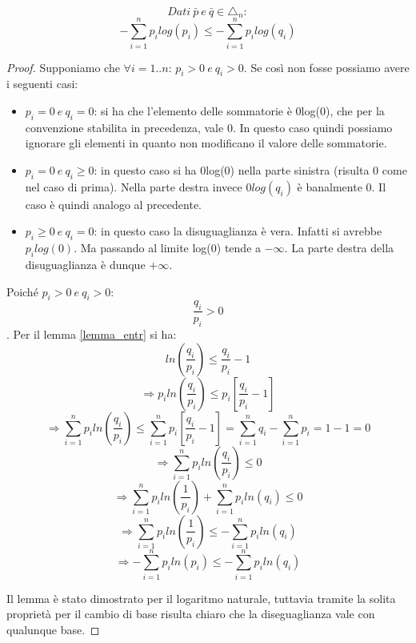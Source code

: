 \begin{lemma}

 \[Dati \ \bar{p} \ e \  \bar{q} \in \triangle_n:\] 
 \[ -\sum_{i=1}^n p_i log(p_i) \le - \sum_{i=1}^n p_i log(q_i) \]

 \begin{proof}
    
   Supponiamo che $\forall i=1..n$: $p_i>0 \ e \ q_i>0$.
  Se così non fosse possiamo avere i seguenti casi:

  \begin{itemize}
   \item $p_i=0 \ e \ q_i=0$: si ha che l'elemento delle sommatorie è 0log(0), che per la convenzione 
   stabilita in precedenza, vale 0. In questo caso quindi possiamo ignorare gli elementi
   in quanto non modificano il valore delle sommatorie.
   \item $p_i=0 \ e \ q_i \ge 0$: in questo caso si ha 0log(0) nella parte sinistra (risulta 0
   come nel caso di prima). Nella parte destra invece $0log(q_i)$ è banalmente 0.
   Il caso è quindi analogo al precedente.
   \item $p_i \ge 0 \ e \ q_i=0$: in questo caso la disuguaglianza è vera. 
   Infatti si avrebbe $p_i log(0)$. Ma passando al limite log(0) tende a $- \infty$. 
   La parte destra della disuguaglianza è dunque $+ \infty$.
  \end{itemize}

   Poiché $p_i>0 \ e \ q_i>0$:
   \[ \frac{q_i}{p_i}>0 \].
   Per il lemma \ref{lemma_entr} si ha:
   \[ ln \left( \frac{q_i}{p_i} \right) \le \frac{q_i}{p_i} - 1 \]
   \[ \Rightarrow p_i ln \left( \frac{q_i}{p_i} \right) \le p_i \left [ \frac{q_i}{p_i} - 1 \right ] \]
   \[ \Rightarrow \sum_{i=1}^{n} p_i ln \left( \frac{q_i}{p_i} \right) \le 
      \sum_{i=1}^{n} p_i \left [ \frac{q_i}{p_i} - 1 \right ] 
       = \sum_{i=1}^{n} q_i - \sum_{i=1}^n p_i = 1-1 = 0
   \]
   \[ \Rightarrow \sum_{i=1}^{n} p_i ln \left( \frac{q_i}{p_i} \right) \le 0 \]
   \[ \Rightarrow \sum_{i=1}^{n} p_i ln \left( \frac{1}{p_i} \right) +
    \sum_{i=1}^{n} p_i ln \left( q_i \right) \le 0 \]
   \[ \Rightarrow \sum_{i=1}^{n} p_i ln \left( \frac{1}{p_i} \right) \le
    -\sum_{i=1}^{n} p_i ln \left( q_i \right) \]
  \[ \Rightarrow -\sum_{i=1}^{n} p_i ln \left( p_i \right) \le
    -\sum_{i=1}^{n} p_i ln \left( q_i \right) \]

  Il lemma è stato dimostrato per il logaritmo naturale, tuttavia tramite la solita proprietà per il cambio di base
  risulta chiaro che la diseguaglianza vale con qualunque base.
 \end{proof}
 \label{gibbs}
\end{lemma}

